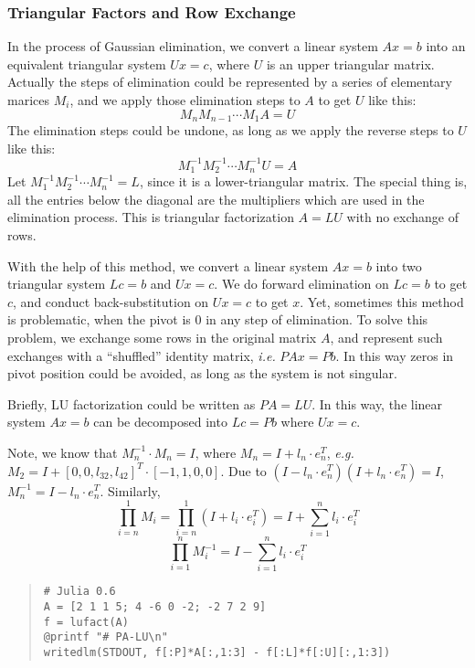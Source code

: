  \subsubsection{Triangular Factors and Row Exchange}
 In the process of Gaussian elimination, we convert a linear system $Ax=b$
 into an equivalent triangular system $Ux=c$, where $U$ is an upper triangular
 matrix. Actually the steps of elimination could be represented by a series
 of elementary marices $M_i$, and we apply those elimination steps to $A$
 to get $U$ like this:
 $$ M_n M_{n-1} \cdots M_1 A = U $$
 The elimination steps could be undone, as long as we apply the reverse steps
 to $U$ like this:
 $$ M_1^{-1} M_2^{-1} \cdots M_n^{-1} U = A $$
 Let $ M_1^{-1} M_2^{-1} \cdots M_n^{-1} = L $, since it is a lower-triangular matrix.
 The special thing is, all the entries below the diagonal are the multipliers
 which are used in the elimination process. This is triangular factorization
 $A=LU$ with no exchange of rows.
 
 With the help of this method, we convert a linear system $Ax=b$ into two 
 triangular system $Lc=b$ and $Ux=c$. We do forward elimination on $Lc=b$
 to get $c$, and conduct back-substitution on $Ux=c$ to get $x$. Yet,
 sometimes this method is problematic, when the pivot is $0$ in any step
 of elimination. To solve this problem, we exchange some rows in the original
 matrix $A$, and represent such exchanges with a ``shuffled'' identity matrix,
 {\it i.e.} $PAx=Pb$. In this way zeros in pivot position could be avoided,
 as long as the system is not singular.

 Briefly, LU factorization could be written as $PA=LU$. In this way, the
 linear system $Ax=b$ can be decomposed into $Lc = Pb$ where $Ux = c$.

 Note, we know that $M_n^{-1} \cdot M_n = I$, where $M_n = I + l_n \cdot e_n^T$,
 {\it e.g.} $M_2 = I + [0,0,l_{32},l_{42}]^T \cdot [-1,1,0,0]$. Due to
 $(I-l_n \cdot e_n^T)(I+l_n \cdot e_n^T) = I$, $M_n^{-1} = I-l_n \cdot e_n^T $.
 Similarly,
 $$\prod\limits_{i=n}^1 M_i = \prod\limits_{i=n}^1 (I+l_i \cdot e_i^T) =
   I + \sum\limits_{i=1}^n l_i \cdot e_i^T$$
 $$\prod\limits_{i=1}^n M_i^{-1} = I - \sum\limits_{i=1}^n l_i \cdot e_i^T $$

\begin{quote}\begin{lstlisting}
# Julia 0.6
A = [2 1 1 5; 4 -6 0 -2; -2 7 2 9]
f = lufact(A)
@printf "# PA-LU\n"
writedlm(STDOUT, f[:P]*A[:,1:3] - f[:L]*f[:U][:,1:3])
\end{lstlisting}\end{quote}

